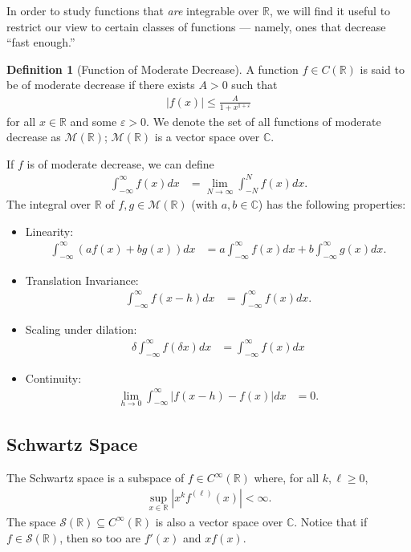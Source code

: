 \documentclass[12pt]{extarticle}
\newcommand{\R}{\mathbb{R}}
\newcommand{\C}{\mathbb{C}}
\theoremstyle{plain}
\theoremstyle{definition}
\newtheorem*{definition}{Definition}
\theoremstyle{remark}
\renewcommand{\newline}{\hfill\break}
\begin{document}
  In order to study functions that \textit{are} integrable over $\R$, we will find it useful to restrict our view to certain classes of functions --- namely, ones that decrease ``fast enough.''
  \begin{definition}[Function of Moderate Decrease]
    A function $f\in C(\R)$ is said to be of moderate decrease if there exists $A > 0$ such that
    \begin{align*}
      |f(x)| \leq \frac{A}{1 + x^{1 + \varepsilon}}
    \end{align*}
    for all $x\in \R$ and some $\varepsilon > 0$. We denote the set of all functions of moderate decrease as $\mathcal{M}(\R)$; $\mathcal{M}(\R)$ is a vector space over $\C$.
  \end{definition}
  If $f$ is of moderate decrease, we can define
  \begin{align*}
    \int_{-\infty}^{\infty}f(x)dx &= \lim_{N\rightarrow\infty}\int_{-N}^{N}f(x)dx.
  \end{align*}
  The integral over $\R$ of $f,g\in \mathcal{M}(\R)$ (with $a,b\in \C$) has the following properties:
  \begin{itemize}
    \item Linearity:
      \begin{align*}
        \int_{-\infty}^{\infty}\left(af(x) + bg(x)\right) dx &= a\int_{-\infty}^{\infty}f(x)dx + b\int_{-\infty}^{\infty}g(x)dx.
      \end{align*}
    \item Translation Invariance:
      \begin{align*}
        \int_{-\infty}^{\infty}f(x-h)dx &= \int_{-\infty}^{\infty}f(x)dx.
      \end{align*}
    \item Scaling under dilation:
      \begin{align*}
        \delta\int_{-\infty}^{\infty}f(\delta x)dx &= \int_{-\infty}^{\infty}f(x)dx
      \end{align*}
    \item Continuity:
      \begin{align*}
        \lim_{h\rightarrow 0}\int_{-\infty}^{\infty}|f(x-h) - f(x)|dx &= 0.
      \end{align*}
  \end{itemize}
  \subsection{Schwartz Space}%
  The Schwartz space is a subspace of $f\in C^{\infty}(\R)$ where, for all $k,\ell \geq 0$,
  \begin{align*}
    \sup_{x\in \R}\left\vert x^{k}f^{(\ell)}(x) \right\vert < \infty.
  \end{align*}
  The space $\mathcal{S}(\R)\subseteq C^{\infty}(\R)$ is also a vector space over $\C$. Notice that if $f\in \mathcal{S}(\R)$, then so too are $f'(x)$ and $xf(x)$.\newline
\end{document}
